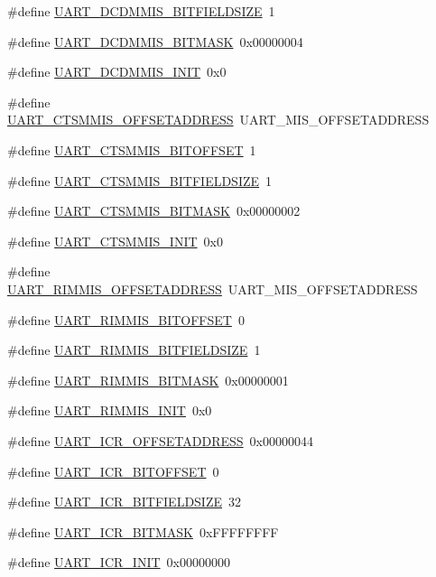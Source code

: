 \begin{DoxyCompactItemize}
\item 
\#define \hyperlink{a00575_a2916b9173d4972dc4d9d21143d335a0e}{UART\_\-DCDMMIS\_\-BITFIELDSIZE}~1
\item 
\#define \hyperlink{a00575_ab54cc94ea4043e1fa6b86f52186abf58}{UART\_\-DCDMMIS\_\-BITMASK}~0x00000004
\item 
\#define \hyperlink{a00575_a51570ca51485105a3b726a5cfa524be2}{UART\_\-DCDMMIS\_\-INIT}~0x0
\item 
\#define \hyperlink{a00575_a9ccc527d3e1d3ef7b7473bed187b35dd}{UART\_\-CTSMMIS\_\-OFFSETADDRESS}~UART\_\-MIS\_\-OFFSETADDRESS
\item 
\#define \hyperlink{a00575_a934d56a5f027b400ddffc09b286ba6f0}{UART\_\-CTSMMIS\_\-BITOFFSET}~1
\item 
\#define \hyperlink{a00575_a8566176a4faf7d52e3825aeddf5a7c4c}{UART\_\-CTSMMIS\_\-BITFIELDSIZE}~1
\item 
\#define \hyperlink{a00575_a4deb46f192974dde0fb7988e926939ac}{UART\_\-CTSMMIS\_\-BITMASK}~0x00000002
\item 
\#define \hyperlink{a00575_aa1332ca2c5dc4adbcba451d13f479a8f}{UART\_\-CTSMMIS\_\-INIT}~0x0
\item 
\#define \hyperlink{a00575_a5fbe41f44aed15ddec262b6eba6022fa}{UART\_\-RIMMIS\_\-OFFSETADDRESS}~UART\_\-MIS\_\-OFFSETADDRESS
\item 
\#define \hyperlink{a00575_a0334dcf62fdeece18d168845b5af675f}{UART\_\-RIMMIS\_\-BITOFFSET}~0
\item 
\#define \hyperlink{a00575_ae4efbc5267c570ba50648d2866696995}{UART\_\-RIMMIS\_\-BITFIELDSIZE}~1
\item 
\#define \hyperlink{a00575_ad3351f74ee2cf12603dfe8fce69a91ce}{UART\_\-RIMMIS\_\-BITMASK}~0x00000001
\item 
\#define \hyperlink{a00575_a6393b8e1638180e038d93e526807c70c}{UART\_\-RIMMIS\_\-INIT}~0x0
\item 
\#define \hyperlink{a00575_aa4b840d9ada45e151e2a7fc21a109b14}{UART\_\-ICR\_\-OFFSETADDRESS}~0x00000044
\item 
\#define \hyperlink{a00575_a679499a245ea56ebad986aa9b3980631}{UART\_\-ICR\_\-BITOFFSET}~0
\item 
\#define \hyperlink{a00575_a92a01cf0b74b4ae786ab3eb7f46cbbe0}{UART\_\-ICR\_\-BITFIELDSIZE}~32
\item 
\#define \hyperlink{a00575_a822d618fad4a8a146fd8113f827b5d09}{UART\_\-ICR\_\-BITMASK}~0xFFFFFFFF
\item 
\#define \hyperlink{a00575_a0c96168f3c409c6a9de43f6d2ac61fdd}{UART\_\-ICR\_\-INIT}~0x00000000

\end{DoxyCompactItemize}
